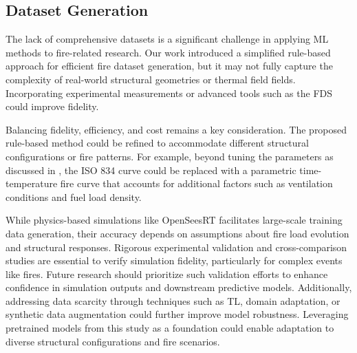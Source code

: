 {\subsection{Dataset Generation}
The lack of comprehensive datasets is a significant challenge in applying ML methods to fire-related research. Our work introduced a simplified rule-based approach for efficient fire dataset generation, but it may not fully capture the complexity of real-world structural geometries or thermal field fields. Incorporating experimental measurements or advanced tools such as  the FDS could improve fidelity. 

Balancing fidelity, efficiency, and cost remains a key consideration. The proposed rule-based method could be refined to accommodate different structural configurations or fire patterns. For example, beyond tuning the parameters as discussed in , the ISO 834 curve could be replaced with a parametric time-temperature fire curve that accounts for additional factors such as ventilation conditions and fuel load density. 

While physics-based simulations like OpenSeesRT facilitates large-scale training data generation, their accuracy depends on assumptions about fire load evolution and structural responses. Rigorous experimental validation and cross-comparison studies are essential to verify simulation fidelity, particularly for complex events like fires. Future research should prioritize such validation efforts to enhance confidence in simulation outputs and downstream predictive models. Additionally, addressing data scarcity through techniques such as TL, domain adaptation, or synthetic data augmentation could further improve model robustness. Leveraging pretrained models from this study as a foundation could enable adaptation to diverse structural configurations and fire scenarios.

}
